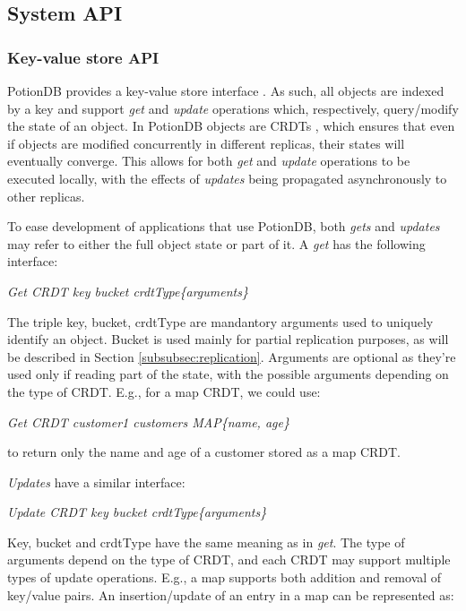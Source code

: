 \documentclass{vldb}
\newcommand{\emphvspace}{0.5\baselineskip}
\newcommand{\lineemph}[1]{\vspace{\emphvspace}\hspace{2em}\emph{#1}\vspace{\emphvspace}}
\begin{document}
\subsection{System API}

\subsubsection{Key-value store API}

PotionDB provides a key-value store interface \cite{???}.
As such, all objects are indexed by a key and support \emph{get} and \emph{update} operations which, respectively, query/modify the state of an object.
In PotionDB objects are CRDTs \cite{???}, which ensures that even if objects are modified concurrently in different replicas, their states will eventually converge.
This allows for both \emph{get} and \emph{update} operations to be executed locally, with the effects of \emph{updates} being propagated asynchronously to other replicas.

To ease development of applications that use PotionDB, both \emph{gets} and \emph{updates} may refer to either the full object state or part of it.
A \emph{get} has the following interface: %

\lineemph{Get CRDT key bucket crdtType\{arguments\}}

The triple key, bucket, crdtType are mandantory arguments used to uniquely identify an object.
Bucket is used mainly for partial replication purposes, as will be described in Section \ref{subsubsec:replication}. 
Arguments are optional as they're used only if reading part of the state, with the possible arguments depending on the type of CRDT. 
E.g., for a map CRDT, we could use: 

\lineemph{Get CRDT customer1 customers MAP\{name, age\}}

to return only the name and age of a customer stored as a map CRDT.

\emph{Updates} have a similar interface:

\lineemph{Update CRDT key bucket crdtType\{arguments\}}

Key, bucket and crdtType have the same meaning as in \emph{get}.
The type of arguments depend on the type of CRDT, and each CRDT may support multiple types of update operations. 
E.g., a map supports both addition and removal of key/value pairs.
An insertion/update of an entry in a map can be represented as: \\
\end{document}
